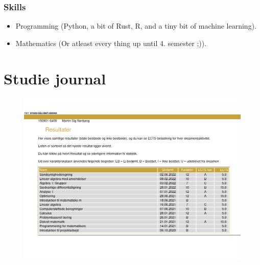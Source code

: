 \documentclass[a4paper, oneside]{book}
\begin{document}
\subsection*{Skills}
\begin{itemize}
  \item Programming (Python, a bit of Rust, R, and a tiny bit of machine learning).
  \item Mathematics (Or atleast every thing up until 4. semester ;)).
\end{itemize}

\chapter*{Studie journal}
\begin{figure}[h]
  \centering
  \includegraphics[scale=0.5]{studie_journal.png}
\end{figure}
\end{document}
